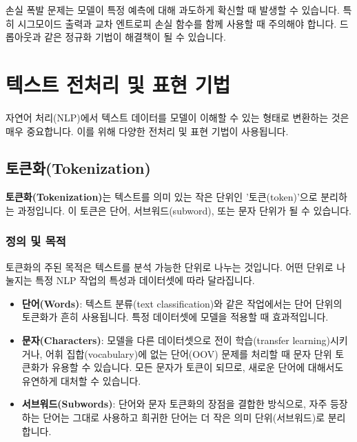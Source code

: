 \documentclass[11pt,a4paper]{article}
\begin{document}
\begin{warningbox}
손실 폭발 문제는 모델이 특정 예측에 대해 과도하게 확신할 때 발생할 수 있습니다. 특히 시그모이드 출력과 교차 엔트로피 손실 함수를 함께 사용할 때 주의해야 합니다. 드롭아웃과 같은 정규화 기법이 해결책이 될 수 있습니다.
\end{warningbox}

\newpage
\section{텍스트 전처리 및 표현 기법}

자연어 처리(NLP)에서 텍스트 데이터를 모델이 이해할 수 있는 형태로 변환하는 것은 매우 중요합니다. 이를 위해 다양한 전처리 및 표현 기법이 사용됩니다.

\subsection{토큰화(Tokenization)}

\begin{conceptbox}
\textbf{토큰화(Tokenization)}는 텍스트를 의미 있는 작은 단위인 '토큰(token)'으로 분리하는 과정입니다. 이 토큰은 단어, 서브워드(subword), 또는 문자 단위가 될 수 있습니다.
\end{conceptbox}

\subsubsection{정의 및 목적}
토큰화의 주된 목적은 텍스트를 분석 가능한 단위로 나누는 것입니다. 어떤 단위로 나눌지는 특정 NLP 작업의 특성과 데이터셋에 따라 달라집니다.

\begin{itemize}
    \item \textbf{단어(Words)}: 텍스트 분류(text classification)와 같은 작업에서는 단어 단위의 토큰화가 흔히 사용됩니다. 특정 데이터셋에 모델을 적용할 때 효과적입니다.
    \item \textbf{문자(Characters)}: 모델을 다른 데이터셋으로 전이 학습(transfer learning)시키거나, 어휘 집합(vocabulary)에 없는 단어(OOV) 문제를 처리할 때 문자 단위 토큰화가 유용할 수 있습니다. 모든 문자가 토큰이 되므로, 새로운 단어에 대해서도 유연하게 대처할 수 있습니다.
    \item \textbf{서브워드(Subwords)}: 단어와 문자 토큰화의 장점을 결합한 방식으로, 자주 등장하는 단어는 그대로 사용하고 희귀한 단어는 더 작은 의미 단위(서브워드)로 분리합니다.
\end{itemize}
\end{document}
